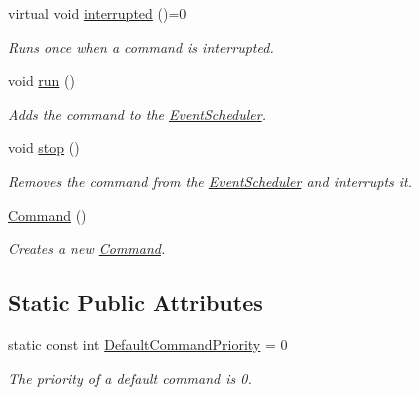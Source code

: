 \begin{DoxyCompactItemize}
\mbox{\label{classlib_iterative_robot_1_1_command_a1c17b601d1b69822cabadb92069d1747}} 
virtual void \mbox{\hyperlink{classlib_iterative_robot_1_1_command_a1c17b601d1b69822cabadb92069d1747}{interrupted}} ()=0
\begin{DoxyCompactList}\small\item\em Runs once when a command is interrupted. \end{DoxyCompactList}\item 
\mbox{\label{classlib_iterative_robot_1_1_command_a3f3790d1b8033d7253a9f44481032ee9}} 
void \mbox{\hyperlink{classlib_iterative_robot_1_1_command_a3f3790d1b8033d7253a9f44481032ee9}{run}} ()
\begin{DoxyCompactList}\small\item\em Adds the command to the \mbox{\hyperlink{classlib_iterative_robot_1_1_event_scheduler}{Event\+Scheduler}}. \end{DoxyCompactList}\item 
\mbox{\label{classlib_iterative_robot_1_1_command_ac91308101424f447f80665244b554171}} 
void \mbox{\hyperlink{classlib_iterative_robot_1_1_command_ac91308101424f447f80665244b554171}{stop}} ()
\begin{DoxyCompactList}\small\item\em Removes the command from the \mbox{\hyperlink{classlib_iterative_robot_1_1_event_scheduler}{Event\+Scheduler}} and interrupts it. \end{DoxyCompactList}\item 
\mbox{\hyperlink{classlib_iterative_robot_1_1_command_a18df2d81039392daeb0b78c346a70537}{Command}} ()
\begin{DoxyCompactList}\small\item\em Creates a new \mbox{\hyperlink{classlib_iterative_robot_1_1_command}{Command}}. \end{DoxyCompactList}\end{DoxyCompactItemize}
\subsection*{Static Public Attributes}
\begin{DoxyCompactItemize}
\item 
\mbox{\label{classlib_iterative_robot_1_1_command_a37cc89119a9f76d0dda57ea21c877c7c}} 
static const int \mbox{\hyperlink{classlib_iterative_robot_1_1_command_a37cc89119a9f76d0dda57ea21c877c7c}{Default\+Command\+Priority}} = 0
\begin{DoxyCompactList}\small\item\em The priority of a default command is 0. \end{DoxyCompactList}\end{DoxyCompactItemize}
